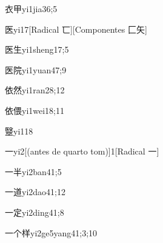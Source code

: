 \begin{verbete}{衣甲}{yi1jia3}{6;5}
\end{verbete}

\begin{verbete}{医}{yi1}{7}[Radical 匸][Componentes 匚矢]
\end{verbete}

\begin{verbete}{医生}{yi1sheng1}{7;5}
\end{verbete}

\begin{verbete}{医院}{yi1yuan4}{7;9}
\end{verbete}

\begin{verbete}{依然}{yi1ran2}{8;12}
\end{verbete}

\begin{verbete}{依偎}{yi1wei1}{8;11}
\end{verbete}

\begin{verbete}{毉}{yi1}{18}
\end{verbete}

\begin{verbete}{一}{yi2}[(antes de quarto tom)]{1}[Radical 一]
\end{verbete}

\begin{verbete}{一半}{yi2ban4}{1;5}
\end{verbete}

\begin{verbete}{一道}{yi2dao4}{1;12}
\end{verbete}

\begin{verbete}{一定}{yi2ding4}{1;8}
\end{verbete}

\begin{verbete}{一个样}{yi2ge5yang4}{1;3;10}
\end{verbete}

